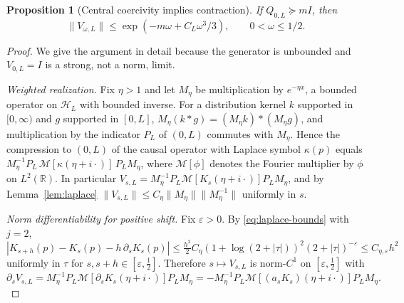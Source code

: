 \documentclass[11pt]{article}
\numberwithin{equation}{section}
\newtheorem{proposition}[theorem]{Proposition}
\theoremstyle{definition}
\theoremstyle{remark}
\newcommand{\HH}{\mathcal H}
\newcommand{\RR}{\mathbb R}
\newcommand{\norm}[1]{\lVert#1\rVert}
\begin{document}
\begin{proposition}[Central coercivity implies contraction]\label{prop:continuation}
If $Q_{0,L}\succeq mI$, then
\begin{equation}\label{eq:continuation}
 \norm{V_{\omega,L}}\le
 \exp(-m\omega+C_L\omega^3/3),\qquad 0<\omega\le1/2.
\end{equation}
\end{proposition}
\begin{proof}
We give the argument in detail because the generator is unbounded and
$V_{0,L}=I$ is a strong, not a norm, limit.

\emph{Weighted realization.} Fix $\eta>1$ and let $M_\eta$ be multiplication
by $e^{-\eta x}$, a bounded operator on $\HH_L$ with bounded inverse. For a
distribution kernel $k$ supported in $[0,\infty)$ and $g$ supported in
$[0,L]$, $M_\eta(k*g)=(M_\eta k)*(M_\eta g)$, and multiplication by the
indicator $P_L$ of $(0,L)$ commutes with $M_\eta$. Hence the compression to
$(0,L)$ of the causal operator with Laplace symbol $\kappa(p)$ equals
$M_\eta^{-1}P_L\,\mathcal M[\kappa(\eta+i\cdot)]\,P_LM_\eta$, where
$\mathcal M[\phi]$ denotes the Fourier multiplier by $\phi$ on $L^2(\RR)$. In
particular $V_{s,L}=M_\eta^{-1}P_L\mathcal M[K_s(\eta+i\cdot)]P_LM_\eta$,
and by Lemma~\ref{lem:laplace} $\norm{V_{s,L}}\le C_\eta\norm{M_\eta}\norm{M_\eta^{-1}}$
uniformly in $s$.

\emph{Norm differentiability for positive shift.} Fix $\varepsilon>0$. By
\eqref{eq:laplace-bounds} with $j=2$,
$|K_{s+h}(p)-K_s(p)-h\,\partial_sK_s(p)|\le\tfrac{h^2}2C_\eta(1+\log(2+|\tau|))^2(2+|\tau|)^{-\varepsilon}
\le C_{\eta,\varepsilon}h^2$ uniformly in $\tau$ for $s,s+h\in[\varepsilon,\tfrac12]$.
Therefore $s\mapsto V_{s,L}$ is norm-$C^1$ on $[\varepsilon,\tfrac12]$ with
\begin{equation}\label{eq:dV}
 \partial_sV_{s,L}=M_\eta^{-1}P_L\mathcal M[\partial_sK_s(\eta+i\cdot)]P_LM_\eta
 =-M_\eta^{-1}P_L\mathcal M[(a_sK_s)(\eta+i\cdot)]P_LM_\eta .
\end{equation}


\end{proof}
\end{document}
